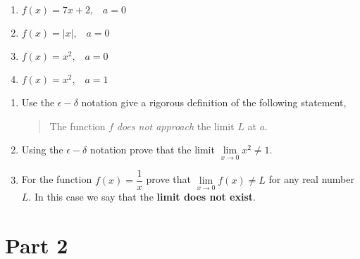 \documentclass[9pt, a4paper, oneside]{amsart}
\begin{document}
\begin{questions}
\begin{itemize}
		      \begin{enumerate}
		      	\item $f(x)=7x+ 2, \hspace{10pt} a=0$
		      	\item $f(x)=|x|, \hspace{10pt} a=0$
		      	\item $f(x)=x^2, \hspace{10pt} a=0$
		      	\item $f(x)=x^2, \hspace{10pt} a=1$
		      \end{enumerate}
	\end{itemize}

	\item
	\begin{enumerate}
		\item Use the $ \epsilon - \delta$ notation give a rigorous definition of the following statement,
		      \begin{quote}
		      	The function $f$ \emph{does not approach} the limit $L$ at $a$.
		      \end{quote}
		\item Using the $ \epsilon - \delta$ notation prove that the limit $ \lim \limits _ {x \rightarrow 0} x^2 \neq 1$.
		\item For the function $ f(x) = \dfrac{1}{x}$
		      prove that $ \lim \limits _ {x \rightarrow 0} f(x) \neq L$ for any real number $ L $. In this case we say that the \textbf{limit does not exist}.
	\end{enumerate}

\end{questions}








\newpage\section*{Part 2}
\end{document}
